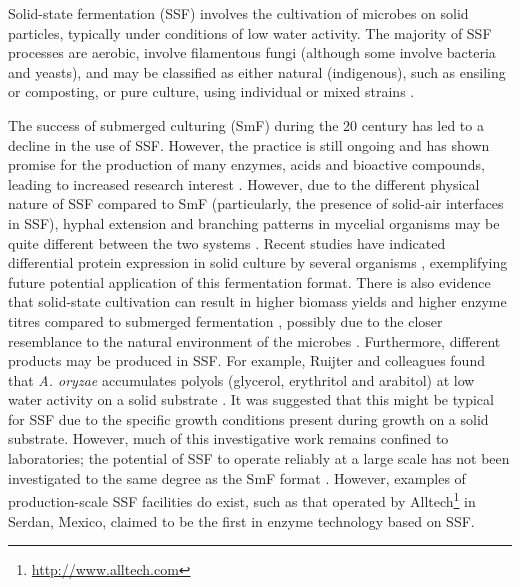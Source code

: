 Solid-state fermentation (SSF) involves the cultivation of microbes on solid particles, typically under conditions of low water activity. The majority of SSF processes are aerobic, involve filamentous fungi (although some involve bacteria and yeasts), and may be classified as either natural (indigenous), such as ensiling or composting, or pure culture, using individual or mixed strains \cite{mitchell2006,pandey2008}.

The success of submerged culturing (SmF) during the 20 century has led to a decline in the use of SSF. However, the practice is still ongoing and has shown promise for the production of many enzymes, acids and bioactive compounds, leading to increased research interest \cite{pandey2000,mitchell2006}. However, due to the different physical nature of SSF compared to SmF (particularly, the presence of solid-air interfaces in SSF), hyphal extension and branching patterns in mycelial organisms may be quite different between the two systems \cite{mitchell2006}. Recent studies have indicated differential protein expression in solid culture by several organisms \cite{tebiesebeke2002,iwashita2002}, exemplifying future potential application of this fermentation format. There is also evidence that solid-state cultivation can result in higher biomass yields and higher enzyme titres compared to submerged fermentation \cite{smith1983,machida2002}, possibly due to the closer resemblance to the natural environment of the microbes \cite{oda2006}. Furthermore, different products may be produced in SSF. For example, Ruijter and colleagues found that \emph{A. oryzae} accumulates polyols (glycerol, erythritol and arabitol) at low water activity on a solid substrate \cite{ruijter2004}. It was suggested that this might be typical for SSF due to the specific growth conditions present during growth on a solid substrate. However, much of this investigative work remains confined to laboratories; the potential of SSF to operate reliably at a large scale has not been investigated to the same degree as the SmF format \cite{pandey2000}. However, examples of production-scale SSF facilities do exist, such as that operated by Alltech\footnote{\href{http://www.alltech.com}{http://www.alltech.com}} in Serdan, Mexico, claimed to be the first in enzyme technology based on SSF.


